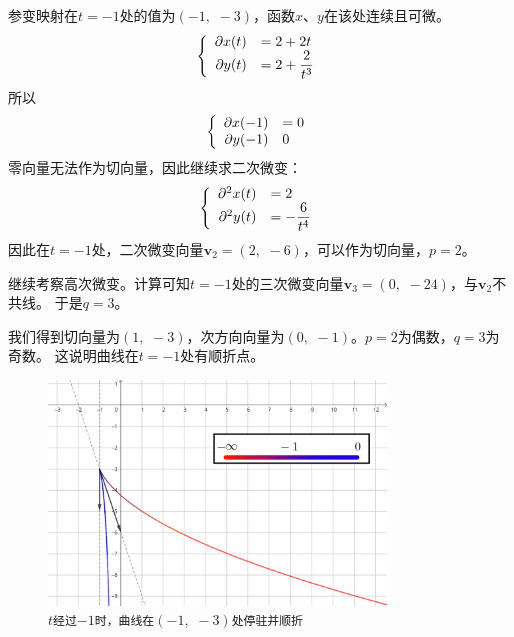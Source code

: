 \documentclass[12pt,UTF8]{ctexbook}
\begin{document}
\begin{so}
    参变映射在$t=-1$处的值为$(-1, \,\,-3)$，函数$x$、$y$在该处连续且可微。
    $$
    \left\{
        \begin{array}[]{rl}
            \partial x(t) &=2 + 2t \\
            \partial y(t) &\displaystyle = 2 + \frac{2}{t^3}\\
        \end{array}
    \right.
    $$
    所以
    $$
    \left\{
        \begin{array}[]{rl}
            \partial x(-1) &= 0 \\
            \partial y(-1) & 0\\
        \end{array}
    \right.
    $$
    零向量无法作为切向量，因此继续求二次微变：
    $$
    \left\{
        \begin{array}[]{rl}
            \partial^2 x(t) &=2 \\
            \partial^2 y(t) &\displaystyle = - \frac{6}{t^4}\\
        \end{array}
    \right.
    $$
    因此在$t=-1$处，二次微变向量$\mathbf{v}_2 = (2, \,\,-6)$，可以作为切向量，$p=2$。

    继续考察高次微变。计算可知$t=-1$处的三次微变向量$\mathbf{v}_3 = (0, \,\,-24)$，与$\mathbf{v}_2$不共线。
    于是$q=3$。
    
    我们得到切向量为$(1,\,\,-3)$，次方向向量为$(0,\,\,-1)$。$p=2$为偶数，$q=3$为奇数。
    这说明曲线在$t=-1$处有顺折点。
\end{so}

\begin{figure}[h] 
    \centering
    \includegraphics[width=0.8\textwidth]{tu/曲线局部渐近行为01.png}
    \caption*{\texttt{$t$经过$-1$时，曲线在$(-1, \,\,-3)$处停驻并顺折}}
\end{figure}
\end{document}

